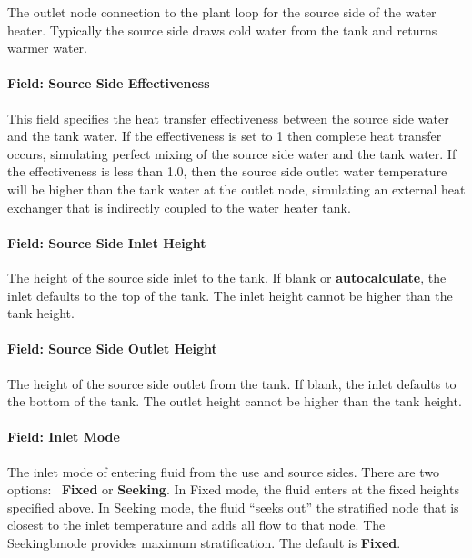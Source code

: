 The outlet node connection to the plant loop for the source side of the water heater. Typically the source side draws cold water from the tank and returns warmer water.

\paragraph{Field: Source Side Effectiveness}\label{field-source-side-effectiveness-1}

This field specifies the heat transfer effectiveness between the source side water and the tank water. If the effectiveness is set to 1 then complete heat transfer occurs, simulating perfect mixing of the source side water and the tank water. If the effectiveness is less than 1.0, then the source side outlet water temperature will be higher than the tank water at the outlet node, simulating an external heat exchanger that is indirectly coupled to the water heater tank.

\paragraph{Field: Source Side Inlet Height}\label{field-source-side-inlet-height-000}

The height of the source side inlet to the tank. If blank or \textbf{autocalculate}, the inlet defaults to the top of the tank. The inlet height cannot be higher than the tank height.

\paragraph{Field: Source Side Outlet Height}\label{field-source-side-outlet-height-000}

The height of the source side outlet from the tank. If blank, the inlet defaults to the bottom of the tank. The outlet height cannot be higher than the tank height.

\paragraph{Field: Inlet Mode}\label{field-inlet-mode-000}

The inlet mode of entering fluid from the use and source sides. There are two options:~ \textbf{Fixed} or \textbf{Seeking}. In Fixed mode, the fluid enters at the fixed heights specified above. In Seeking mode, the fluid ``seeks out'' the stratified node that is closest to the inlet temperature and adds all flow to that node. The Seekingbmode provides maximum stratification. The default is \textbf{Fixed}.

